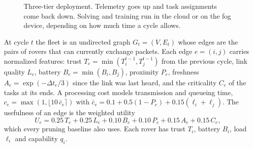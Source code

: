 \documentclass[11pt]{article}
\begin{document}
\begin{figure}[t]
\centering
{}
\caption{Three-tier deployment. Telemetry goes up and task assignments come
back down. Solving and training run in the cloud or on the fog device,
depending on how much time a cycle allows.}
\label{fig:arch}
\end{figure}

At cycle $t$ the fleet is an undirected graph $G_t=(V,E_t)$ whose edges are
the pairs of rovers that can currently exchange packets. Each edge
$e=(i,j)$ carries normalized features: trust $T_e=\min(T_i^{t-1},T_j^{t-1})$
from the previous cycle, link quality $L_e$, battery $B_e=\min(B_i,B_j)$,
proximity $P_e$, freshness $A_e=\exp(-\Delta t_e/3)$ since the link was last
heard, and the criticality $C_e$ of the tasks at its ends. A processing cost
models transmission and queueing time,
$c_e=\max(1,\lfloor10\,\bar c_e\rceil)$ with
$\bar c_e=0.1+0.5(1-P_e)+0.15(\ell_i+\ell_j)$. The usefulness of an edge is
the weighted utility
\begin{equation}
U_e=0.25\,T_e+0.25\,L_e+0.10\,B_e+0.10\,P_e+0.15\,A_e+0.15\,C_e,
\label{eq:utility}
\end{equation}
which every pruning baseline also uses. Each rover has trust $T_i$, battery
$B_i$, load $\ell_i$ and capability $q_i$.
\end{document}
